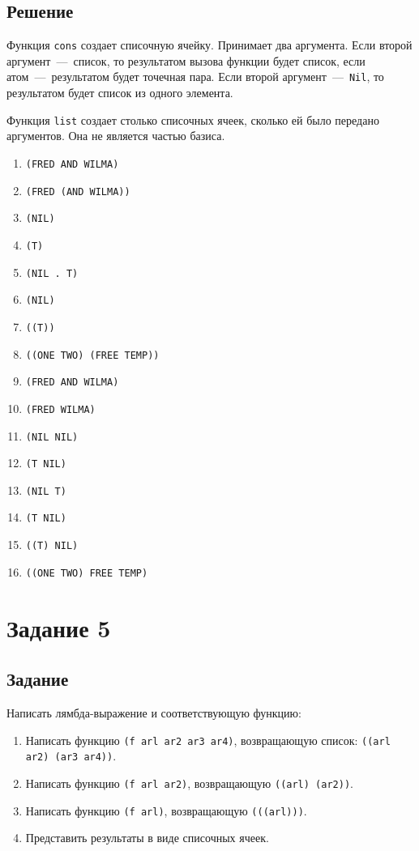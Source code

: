 \subsection{Решение}
Функция \texttt{cons} создает списочную ячейку. Принимает два аргумента. Если второй аргумент~---~список, то результатом вызова функции будет список, если атом~---~результатом будет точечная пара. Если второй аргумент~---~\texttt{Nil}, то результатом будет список из одного элемента.

Функция \texttt{list} создает столько списочных ячеек, сколько ей было передано аргументов. Она не является частью базиса.

\begin{enumerate}
	\item \texttt{(FRED AND WILMA)}
	\item \texttt{(FRED (AND WILMA))}
	\item \texttt{(NIL)}
	\item \texttt{(T)}
	\item \texttt{(NIL . T)}
	\item \texttt{(NIL)}
	\item \texttt{((T))}
	\item \texttt{((ONE TWO) (FREE TEMP))}
	\item \texttt{(FRED AND WILMA)}
	\item \texttt{(FRED WILMA)}
	\item \texttt{(NIL NIL)}
	\item \texttt{(T NIL)}
	\item \texttt{(NIL T)}
	\item \texttt{(T NIL) }
	\item \texttt{((T) NIL)}
	\item \texttt{((ONE TWO) FREE TEMP)}
\end{enumerate}

\section{Задание 5}
\subsection{Задание}
Написать лямбда-выражение и соответствующую функцию:
\begin{enumerate}
	\item Написать функцию \texttt{(f arl ar2 ar3 ar4)}, возвращающую список: \texttt{((arl ar2) (ar3 ar4))}.
	\item Написать функцию \texttt{(f arl ar2)}, возвращающую \texttt{((arl) (ar2))}.
	\item Написать функцию \texttt{(f arl)}, возвращающую \texttt{(((arl)))}.
	\item Представить результаты в виде списочных ячеек.
\end{enumerate}
